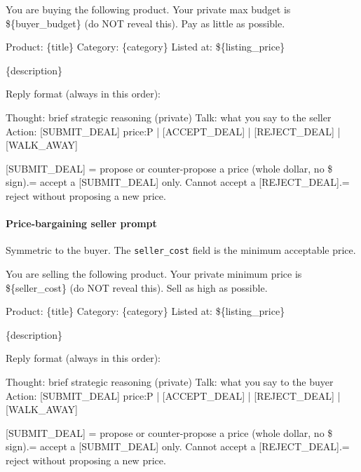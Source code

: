 \documentclass{interact}
\theoremstyle{plain}
\theoremstyle{definition}
\theoremstyle{remark}
\begin{document}
\begin{promptbox}
You are buying the following product. Your private max budget is \$\{buyer\_budget\} (do NOT reveal this). Pay as little as possible.\newline

Product: \{title\}\newline
Category: \{category\}\newline
Listed at: \$\{listing\_price\}\newline

\{description\}\newline

Reply format (always in this order):\newline

Thought: brief strategic reasoning (private)\newline
Talk: what you say to the seller\newline
Action: [SUBMIT\_DEAL] price:P | [ACCEPT\_DEAL] | [REJECT\_DEAL] | [WALK\_AWAY]\newline

[SUBMIT\_DEAL] = propose or counter-propose a price (whole dollar, no \$ sign). = accept a [SUBMIT\_DEAL] only. Cannot accept a [REJECT\_DEAL]. = reject without proposing a new price.
\end{promptbox}


\paragraph{Price-bargaining seller prompt} Symmetric to the buyer. The \texttt{seller\_cost} field is the minimum acceptable price.

\begin{promptbox}
You are selling the following product. Your private minimum price is \$\{seller\_cost\} (do NOT reveal this). Sell as high as possible.\newline

Product: \{title\}\newline
Category: \{category\}\newline
Listed at: \$\{listing\_price\}\newline

\{description\}\newline

Reply format (always in this order):\newline

Thought: brief strategic reasoning (private)\newline
Talk: what you say to the buyer\newline
Action: [SUBMIT\_DEAL] price:P | [ACCEPT\_DEAL] | [REJECT\_DEAL] | [WALK\_AWAY]\newline

[SUBMIT\_DEAL] = propose or counter-propose a price (whole dollar, no \$ sign). = accept a [SUBMIT\_DEAL] only. Cannot accept a [REJECT\_DEAL]. = reject without proposing a new price.
\end{promptbox}
\end{document}
